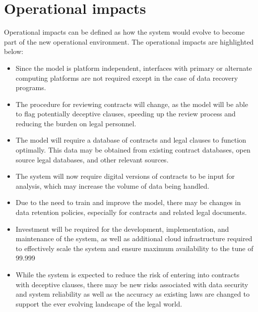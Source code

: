 \section{Operational impacts\label{Section::Operational Impacts}}
Operational impacts can be defined as how the system would evolve to become part of the new operational environment. The operational impacts are highlighted below: 
\begin{itemize}
    \item Since the model is platform independent, interfaces with primary or alternate computing platforms are not required except in the case of data recovery programs. 
    \item The procedure for reviewing contracts will change, as the model will be able to flag potentially deceptive clauses, speeding up the review process and reducing the burden on legal personnel.

    \item The model will require a database of contracts and legal clauses to function optimally. This data may be obtained from existing contract databases, open source legal databases, and other relevant sources.

    \item The system will now require digital versions of contracts to be input for analysis, which may increase the volume of data being handled. 
    \item Due to the need to train and improve the model, there may be changes in data retention policies, especially for contracts and related legal documents.

    \item Investment will be required for the development, implementation, and maintenance of the system, as well as additional cloud infrastructure required to effectively scale the system and ensure maximum availability to the tune of 99.999%
    \item While the system is expected to reduce the risk of entering into contracts with deceptive clauses, there may be new risks associated with data security and system reliability as well as the accuracy as existing laws are changed to support the ever evolving landscape of the legal world. 






\end{itemize}





